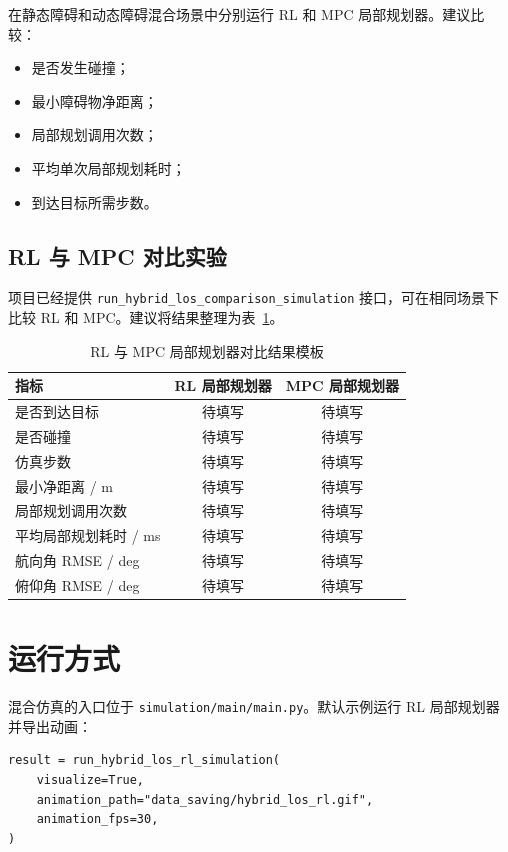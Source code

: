 \documentclass[UTF8,a4paper,12pt]{ctexart}
\begin{document}
在静态障碍和动态障碍混合场景中分别运行 RL 和 MPC 局部规划器。建议比较：
\begin{itemize}
  \item 是否发生碰撞；
  \item 最小障碍物净距离；
  \item 局部规划调用次数；
  \item 平均单次局部规划耗时；
  \item 到达目标所需步数。
\end{itemize}

\subsection{RL 与 MPC 对比实验}

项目已经提供 \texttt{run\_hybrid\_los\_comparison\_simulation} 接口，可在相同场景下比较 RL 和 MPC。建议将结果整理为表~\ref{tab:compare-template}。

\begin{table}[htbp]
\centering
\caption{RL 与 MPC 局部规划器对比结果模板}
\label{tab:compare-template}
\begin{tabular}{lcc}
\toprule
指标 & RL 局部规划器 & MPC 局部规划器 \\
\midrule
是否到达目标 & 待填写 & 待填写 \\
是否碰撞 & 待填写 & 待填写 \\
仿真步数 & 待填写 & 待填写 \\
最小净距离 / m & 待填写 & 待填写 \\
局部规划调用次数 & 待填写 & 待填写 \\
平均局部规划耗时 / ms & 待填写 & 待填写 \\
航向角 RMSE / deg & 待填写 & 待填写 \\
俯仰角 RMSE / deg & 待填写 & 待填写 \\
\bottomrule
\end{tabular}
\end{table}

\section{运行方式}

混合仿真的入口位于 \texttt{simulation/main/main.py}。默认示例运行 RL 局部规划器并导出动画：

\begin{lstlisting}[style=pythonstyle]
result = run_hybrid_los_rl_simulation(
    visualize=True,
    animation_path="data_saving/hybrid_los_rl.gif",
    animation_fps=30,
)
\end{lstlisting}
\end{document}
